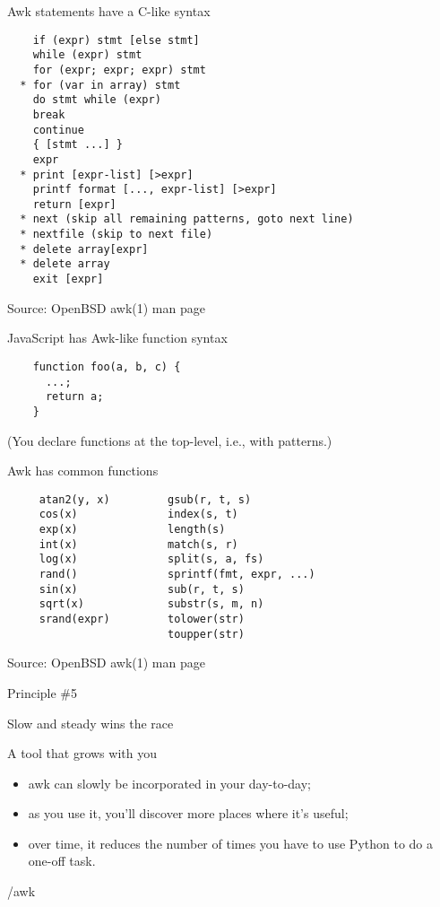 \documentclass{beamer}
\renewcommand\big[1]{
  \begin{center}
    \Large{#1}
  \end{center}
}
\begin{document}
\begin{frame}[fragile]
  \big{Awk statements have a C-like syntax}

  \begin{lstlisting}
    if (expr) stmt [else stmt]
    while (expr) stmt
    for (expr; expr; expr) stmt
  * for (var in array) stmt
    do stmt while (expr)
    break
    continue
    { [stmt ...] }
    expr
  * print [expr-list] [>expr]
    printf format [..., expr-list] [>expr]
    return [expr]
  * next (skip all remaining patterns, goto next line)
  * nextfile (skip to next file)
  * delete array[expr]
  * delete array
    exit [expr]
  \end{lstlisting}
  \scriptsize{Source: OpenBSD awk(1) man page}
\end{frame}

\begin{frame}[fragile]
  \big{JavaScript has Awk-like function syntax}

  \begin{lstlisting}
    function foo(a, b, c) {
      ...;
      return a;
    }
  \end{lstlisting}

  \scriptsize{(You declare functions at the top-level, i.e., with patterns.)}
\end{frame}

\begin{frame}[fragile]
  \big{Awk has common functions}
  \begin{lstlisting}
     atan2(y, x)         gsub(r, t, s)
     cos(x)              index(s, t)
     exp(x)              length(s)
     int(x)              match(s, r)
     log(x)              split(s, a, fs)
     rand()              sprintf(fmt, expr, ...)
     sin(x)              sub(r, t, s)
     sqrt(x)             substr(s, m, n)
     srand(expr)         tolower(str)
                         toupper(str)
  \end{lstlisting}

  \scriptsize{Source: OpenBSD awk(1) man page}
\end{frame}

\begin{frame}
  \centering\Huge{Principle \#5}
  \big{Slow and steady wins the race}
\end{frame}

\begin{frame}
  \big{A tool that grows with you}

  \begin{itemize}
    \item awk can slowly be incorporated in your day-to-day;
    \item as you use it, you'll discover more places where it's useful;
    \item over time, it reduces the number of times you have to use Python to do a one-off task.
  \end{itemize}
\end{frame}

\begin{frame}
  \centering\Huge{/awk}
\end{frame}
\end{document}
